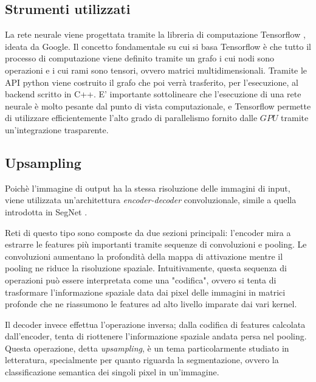\documentclass[12pt,a4paper]{report}
\begin{document}
\subsection{Strumenti utilizzati}

La rete neurale viene progettata tramite la libreria di computazione Tensorflow
\cite{tensorflow2015-whitepaper}, ideata da Google. Il concetto fondamentale su
cui si basa Tensorflow è che tutto il processo di computazione viene definito
tramite un grafo i cui nodi sono operazioni e i cui rami sono tensori, ovvero
matrici multidimensionali. Tramite le API python viene costruito il grafo che
poi verrà trasferito, per l'esecuzione, al backend scritto in C++. E' importante
sottolineare che l'esecuzione di una rete neurale è molto pesante dal punto di
vista computazionale, e Tensorflow permette di utilizzare efficientemente l'alto
grado di parallelismo fornito dalle $GPU$ tramite un'integrazione trasparente.


\subsection{Upsampling}

Poichè l'immagine di output ha la stessa risoluzione delle immagini di input,
viene utilizzata un'architettura \textit{encoder-decoder} convoluzionale, simile
a quella introdotta in SegNet \cite{badrinarayanan2015segnet2}.

Reti di questo tipo sono composte da due sezioni principali: l'encoder mira a 
estrarre le features più importanti tramite sequenze di convoluzioni e pooling.
Le convoluzioni aumentano la profondità della mappa di attivazione mentre il
pooling ne riduce la risoluzione spaziale. Intuitivamente, questa sequenza di
operazioni può essere interpretata come una "codifica", ovvero si tenta di
trasformare l'informazione spaziale data dai pixel delle immagini in matrici
profonde che ne riassumono le features ad alto livello imparate dai vari kernel.

Il decoder invece effettua l'operazione inversa; dalla codifica di
features calcolata dall'encoder, tenta di riottenere l'informazione spaziale
andata persa nel pooling. Questa operazione, detta \textit{upsampling}, è
un tema particolarmente studiato in letteratura, specialmente per quanto
riguarda la segmentazione, ovvero la classificazione semantica dei singoli
pixel in un'immagine.
\end{document}
